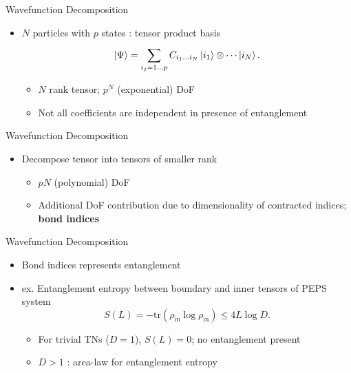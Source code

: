 \documentclass{beamer}
\begin{document}
\begin{frame}{Wavefunction Decomposition}
	\begin{itemize}
	\item $N$ particles with $p$ states : tensor product basis
		\[
			\ket{\Psi }=\sum_{i_{j}=1\dots p}^{} C_{i_{1}\dots i_{N}}\ket{i_{1}}\otimes\cdots\ket{i_{N}}
		.\]
		\begin{itemize}
		\item $N$ rank tensor; $p^{N}$ (exponential) DoF
		\item Not all coefficients are independent in presence of entanglement
	\\
		\end{itemize}	
	\end{itemize}
\end{frame}
\begin{frame}{Wavefunction Decomposition}
	\begin{itemize}
	\item Decompose tensor into tensors of smaller rank
	\\
		\begin{itemize}
		\item $pN$ (polynomial) DoF
		\item Additional DoF contribution due to dimensionality of contracted indices; \textbf{bond indices}
		\end{itemize}
	\end{itemize}
\end{frame}

\begin{frame}{Wavefunction Decomposition}
	\begin{itemize}
	\item Bond indices represents entanglement
	\item ex. Entanglement entropy between boundary and inner tensors of PEPS system
	\\
		\[
		S(L)=-\text{tr}(\rho_{\text{in}}\log{\rho_{\text{in}}})\leq 4L \log{D}
	.\]
	\begin{itemize}
	\item For trivial TNs ($D=1$), $S(L)=0$; no entanglement present
	\item $D>1$ : area-law for entanglement entropy
	\end{itemize}
	\end{itemize}
\end{frame}
\end{document}
